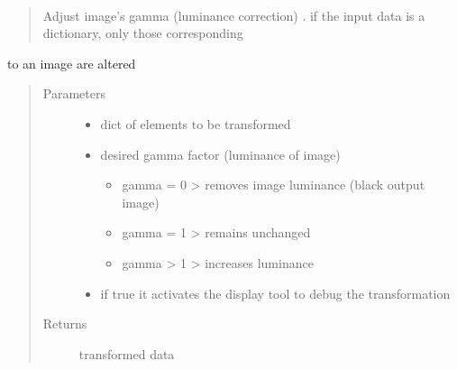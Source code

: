 \documentclass[letterpaper,10pt,english]{sphinxmanual}
\begin{document}
\begin{fulllineitems}
\label{\detokenize{ida_lib.operations:ida_lib.operations.transforms.change_gamma}}~\begin{quote}

Adjust image’s gamma (luminance correction) . if the input data is a dictionary, only those corresponding
\end{quote}

to an image are altered
\begin{quote}\begin{description}
\item[{Parameters}] \leavevmode\begin{itemize}
\item {} 
 \textendash{} dict of elements to be transformed

\item {} 
 \textendash{} 
desired gamma factor (luminance of image)
\begin{itemize}
\item {} 
gamma = 0 \sphinxhyphen{}\textgreater{} removes image luminance (black output image)

\item {} 
gamma = 1 \sphinxhyphen{}\textgreater{} remains unchanged

\item {} 
gamma \textgreater{} 1 \sphinxhyphen{}\textgreater{} increases luminance

\end{itemize}


\item {} 
 \textendash{} if true it activates the display tool to debug the transformation

\end{itemize}

\item[{Returns}] \leavevmode
transformed data

\end{description}\end{quote}

\end{fulllineitems}
\end{document}

